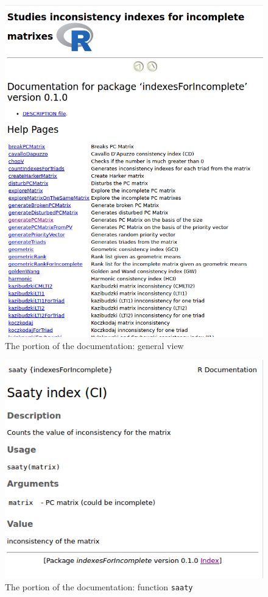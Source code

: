 \begin{figure}[h]
\centerline{\includegraphics[scale=0.58]{images/kod31.png}}
\caption{The portion of the documentation: general view}
\label{fig:rstudio}
\end{figure}

\begin{figure}[h]
\centerline{\includegraphics[scale=0.58]{images/kod32.png}}
\caption{The portion of the documentation: function \texttt{saaty}}
\label{fig:rstudio}
\end{figure}

